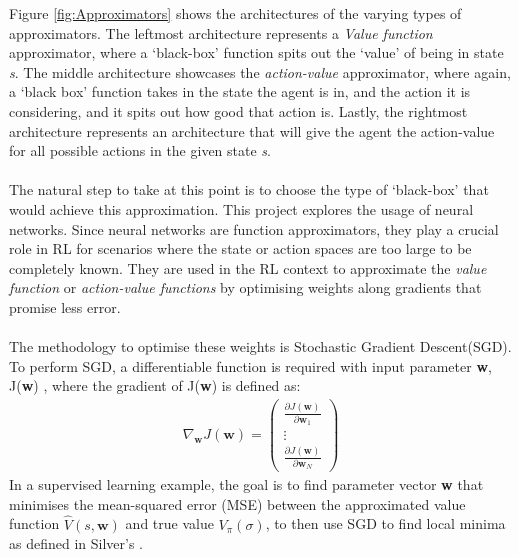 \documentclass[ %
                    author={Ashwinder Khurana},
                supervisor={Prof Dave Cliff},
                    degree={MEng},
                     title={The Deeply Reinforced Trader},
                  subtitle={},
                      type={enterprise},
                      year={2020} ]{dissertation}
\def\gradient{
\begin{pmatrix}
    \frac{\partial J(\textbf{w})}{\partial\textbf{w}_1} \\
    \vdots \\
     \frac{\partial J(\textbf{w})}{\partial\textbf{w}_N}
\end{pmatrix}}
\begin{document}
{\begin{figure}[H]
\end{figure}

\noindent
Figure \ref{fig:Approximators} shows the architectures of the varying types of approximators. The leftmost architecture represents a \textit{Value function} approximator, where a \enquote*{black-box} function spits out the \enquote*{value} of being in state \textit{s}. The middle architecture showcases the \textit{action-value} approximator, where again, a \enquote*{black box} function takes in the state the agent is in, and the action it is considering, and it spits out how good that action is. Lastly, the rightmost architecture represents an architecture that will give the agent the action-value for all possible actions in the given state \textit{s}. 
\\
\\
The natural step to take at this point is to choose the type of \enquote*{black-box} that would achieve this approximation. This project explores the usage of neural networks. Since neural networks are function approximators, they play a crucial role in RL for scenarios where the state or action spaces are too large to be completely known. They are used in the RL context to approximate the \textit{value function} or \textit{action-value functions} by optimising weights along gradients that promise less error. 
\\
\\
The methodology to optimise these weights is Stochastic Gradient Descent(SGD). To perform SGD, a differentiable function is required with input parameter \textbf{w}, J(\textbf{w}) , where the gradient of J(\textbf{w}) is defined as:
\begin{equation}
\label{parameter-gradient}
\begin{split}
\nabla_\textbf{w} J(\textbf{w}) = \gradient
\end{split}
\end{equation}
In a supervised learning example, the goal is to find parameter vector \textbf{w} that minimises the mean-squared error (MSE) between the approximated value function $\hat{V}(s, \textbf{w})$ and true value $V_\pi(\sigma)$, to then use SGD to find local minima as defined in Silver's \cite{VA-fig}.

}
\end{document}
